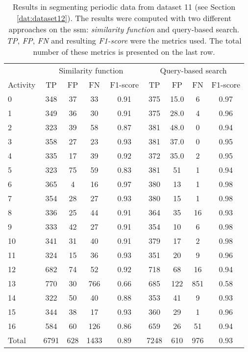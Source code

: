 \begin{table}
\centering
\caption{Results in segmenting periodic data from dataset 11 (see Section \ref{dat:dataset12}). The results were computed with two different approaches on the \gls{ssm}: \textit{similarity function} and query-based search. \textit{TP}, \textit{FP}, \textit{FN }and resulting \textit{F1-score} were the metrics used. The total number of these metrics is presented on the last row.}
\begin{tabular}{lcccccccc}
\toprule
          & \multicolumn{4}{c}{Similarity function} & \multicolumn{4}{c}{Query-based search}\\
Activity &    TP &     FP &    FN &  F1-score &    TP &     FP &   FN &  F1-score \\
\midrule
0  &   348 &   37 &    33 &      0.91 &   375 &   15.0 &    6 &      0.97 \\
1  &   349 &   36 &    30 &      0.91 &   375 &   28.0 &    4 &      0.96 \\
2  &   323 &   39 &    58 &      0.87 &   381 &   48.0 &    0 &      0.94 \\
3  &   358 &   27 &    23 &      0.93 &   381 &   37.0 &    0 &      0.95 \\
4  &   335 &   17 &    39 &      0.92 &   372 &   35.0 &    2 &      0.95 \\
5  &   323 &   75 &    59 &      0.83 &   381 &   51 &    1 &      0.94 \\
6  &   365 &    4 &    16 &      0.97 &   380 &   13 &    1 &      0.98 \\
7  &   354 &   28 &    27 &      0.93 &   380 &   15 &    1 &      0.98 \\
8  &   336 &   25 &    44 &      0.91 &   364 &   35 &   16 &      0.93 \\
9  &   333 &   42 &    27 &      0.91 &   354 &   10 &    6 &      0.98 \\
10 &   341 &   31 &    40 &      0.91 &   379 &   17 &    2 &      0.98 \\
11 &   324 &   15 &    36 &      0.93 &   351 &   20 &    9 &      0.96 \\
12 &   682 &   74 &    52 &      0.92 &   718 &   68 &   16 &      0.94 \\
13 &   770 &   30 &   766 &      0.66 &   685 &  122 &  851 &      0.58 \\
14 &   322 &   50 &    40 &      0.88 &   353 &   41 &    9 &      0.93 \\
15 &   344 &   38 &    17 &      0.93 &   360 &   29 &    1 &      0.96 \\
16 &   584 &   60 &   126 &      0.86 &   659 &   26 &   51 &      0.94 \\
\midrule
Total &  6791 &  628 &  1433 &      0.89 &  7248 &  610 &  976 &      0.93\\
\bottomrule
\end{tabular}
\label{tab:periodic_results}
\end{table}


